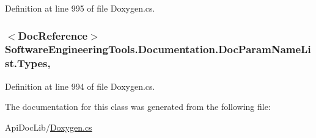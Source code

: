 Definition at line 995 of file Doxygen.\+cs.

\hypertarget{class_software_engineering_tools_1_1_documentation_1_1_doc_param_name_list_a75bc981d62487ee28dad2b03813142e5}{
\subsubsection[{Types}]{$<${\bf Doc\+Reference}$>$ Software\+Engineering\+Tools.\+Documentation.\+Doc\+Param\+Name\+List.\+Types\hspace{0.3cm}{\ttfamily [get]}, {\ttfamily [set]}}}\label{class_software_engineering_tools_1_1_documentation_1_1_doc_param_name_list_a75bc981d62487ee28dad2b03813142e5}


Definition at line 994 of file Doxygen.\+cs.



The documentation for this class was generated from the following file\+:\begin{DoxyCompactItemize}
\item 
Api\+Doc\+Lib/\hyperlink{_doxygen_8cs}{Doxygen.\+cs}\end{DoxyCompactItemize}
